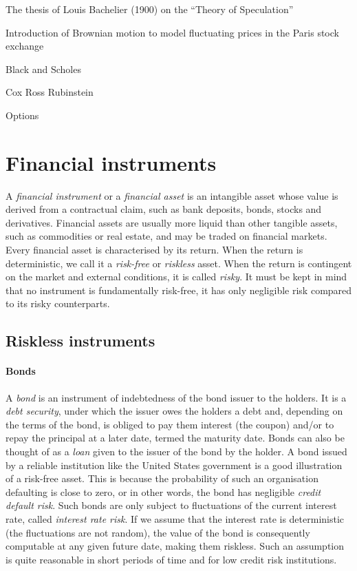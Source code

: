 
The thesis of Louis Bachelier (1900) on the ``Theory of Speculation”

Introduction of Brownian motion to model fluctuating prices in the Paris stock exchange

Black and Scholes

Cox Ross Rubinstein

Options

\section{Financial instruments}
\label{sec:intro-assets}

A \emph{financial instrument} or a \emph{financial asset} is an intangible asset whose value is derived from a contractual claim, such as bank deposits, bonds, stocks and derivatives. Financial assets are usually more liquid than other tangible assets, such as commodities or real estate, and may be traded on financial markets. Every financial asset is characterised by its return. When the return is deterministic, we call it a \emph{risk-free} or \emph{riskless} asset. When the return is contingent on the market and external conditions, it is called \emph{risky}. It must be kept in mind that no instrument is fundamentally risk-free, it has only negligible risk compared to its risky counterparts.



\subsection{Riskless instruments}
\label{subsec:intro-assets-riskless}


\paragraph{Bonds}
A \emph{bond} is an instrument of indebtedness of the bond issuer to the holders. It is a \emph{debt security}, under which the issuer owes the holders a debt and, depending on the terms of the bond, is obliged to pay them interest (the coupon) and/or to repay the principal at a later date, termed the maturity date. Bonds can also be thought of as a \emph{loan} given to the issuer of the bond by the holder. A bond issued by a reliable institution like the United States government is a good illustration of a risk-free asset. This is because the probability of such an organisation defaulting is close to zero, or in other words, the bond has negligible \emph{credit default risk}. Such bonds are only subject to fluctuations of the current interest rate, called \emph{interest rate risk}. If we assume that the interest rate is deterministic (the fluctuations are not random), the value of the bond is consequently computable at any given future date, making them riskless. Such an assumption is quite reasonable in short periods of time and for low credit risk institutions.


